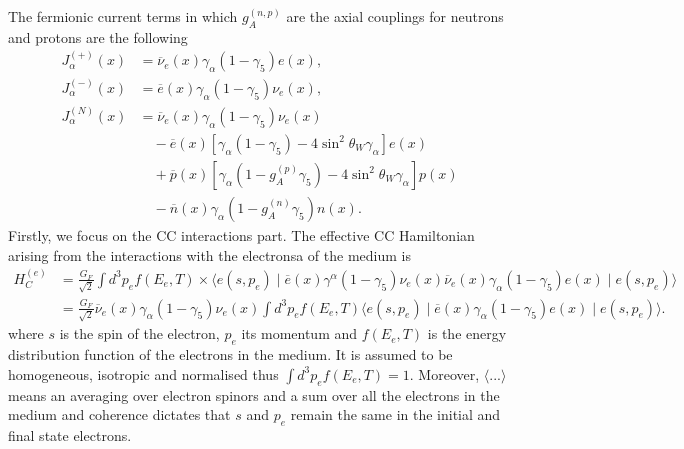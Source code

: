 The fermionic current terms in which $g_A^{(n, p)}$ are the axial couplings for neutrons and protons are the following
\begin{equation}
    \label{eq:fermionic-currents}
    \begin{aligned}
        J^{(+)}_\alpha(x) &= \overline{\nu}_e(x) \gamma_\alpha (1 - \gamma_5) e(x), \\
        J^{(-)}_\alpha(x) &= \overline{e}(x) \gamma_\alpha (1 - \gamma_5) \nu_e(x), \\
        J^{(N)}_\alpha(x) &= \overline{\nu}_e(x) \gamma_\alpha (1 - \gamma_5) \nu_e(x) \\
        &\quad - \overline{e}(x) \left[ \gamma_\alpha(1 - \gamma_5) - 4\sin^2\theta_W \gamma_\alpha \right] e(x) \\
        &\quad + \overline{p}(x) \left[ \gamma_\alpha(1 - g_A^{(p)}\gamma_5) - 4\sin^2\theta_W \gamma_\alpha \right] p(x) \\
        &\quad - \overline{n}(x) \gamma_\alpha (1 - g_A^{(n)}\gamma_5) n(x).
    \end{aligned}
\end{equation}
Firstly, we focus on the \ac{CC} interactions part. The effective \ac{CC} Hamiltonian arising from the interactions with the electronsa of the medium is
\begin{equation}
    \label{eq:H_C_e_1}
    \begin{aligned}
        H_C^{(e)} &= \frac{G_F}{\sqrt{2}} \int d^3p_e f(E_e, T) \times \boldsymbol{\Big\langle} e(s, p_e) \mid \overline{e}(x)\gamma^\alpha(1 - \gamma_5)\nu_e(x) \overline{\nu}_e(x)\gamma_\alpha(1 - \gamma_5)e(x) \mid e(s, p_e)\boldsymbol{\Big\rangle} \\
        &= \frac{G_F}{\sqrt{2}} \overline{\nu}_e(x)\gamma_\alpha(1 - \gamma_5)\nu_e(x) \int d^3p_e f(E_e, T) \boldsymbol{\Big\langle} e(s, p_e) \mid \overline{e}(x)\gamma_\alpha(1 - \gamma_5)e(x) \mid e(s, p_e)\boldsymbol{\Big\rangle}.
    \end{aligned}
\end{equation}
where $s$ is the spin of the electron, $p_e$ its momentum and $f(E_e, T)$ is the energy distribution function of the electrons in the medium. It is assumed to be homogeneous, isotropic and normalised thus $\int d^3p_e f(E_e, T) = 1$. Moreover, $\boldsymbol{\Big\langle}... \boldsymbol{\Big\rangle}$ means an averaging over electron spinors and a sum over all the electrons in the medium and coherence dictates that $s$ and $p_e$ remain the same in the initial and final state electrons.

